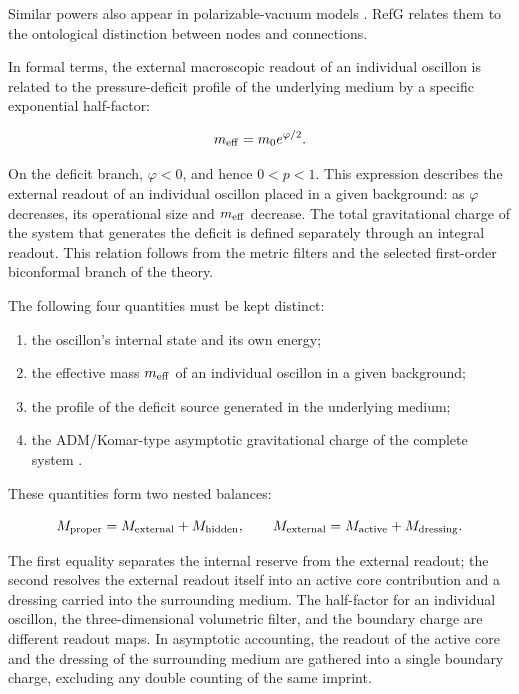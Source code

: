 \documentclass[11pt,a4paper]{article}
\begin{document}
Similar powers also appear in polarizable-vacuum models \citep{dicke1957,puthoff2002}. RefG relates them to the ontological distinction between nodes and connections.

In formal terms, the external macroscopic readout of an individual oscillon is related to the pressure-deficit profile of the underlying medium by a specific exponential half-factor:

\begin{equation}
m_{\rm eff}=m_0 e^{\varphi/2}.
\label{eq:effective-mass}
\end{equation}

On the deficit branch, $\varphi<0$, and hence $0<p<1$. This expression describes the external readout of an individual oscillon placed in a given background: as $\varphi$ decreases, its operational size and $m_{\rm eff}$ decrease. The total gravitational charge of the system that generates the deficit is defined separately through an integral readout. This relation follows from the metric filters and the selected first-order biconformal branch of the theory.

The following four quantities must be kept distinct:

\begin{enumerate}
\item the oscillon's internal state and its own energy;
\item the effective mass $m_{\rm eff}$ of an individual oscillon in a given background;
\item the profile of the deficit source generated in the underlying medium;
\item the ADM/Komar-type asymptotic gravitational charge of the complete system \citep{arnowitt1962,komar1959}.
\end{enumerate}

These quantities form two nested balances:

\begin{equation}
M_{\rm proper}=M_{\rm external}+M_{\rm hidden},
\qquad
M_{\rm external}=M_{\rm active}+M_{\rm dressing}.
\end{equation}

The first equality separates the internal reserve from the external readout; the second resolves the external readout itself into an active core contribution and a dressing carried into the surrounding medium. The half-factor for an individual oscillon, the three-dimensional volumetric filter, and the boundary charge are different readout maps. In asymptotic accounting, the readout of the active core and the dressing of the surrounding medium are gathered into a single boundary charge, excluding any double counting of the same imprint.
\end{document}
